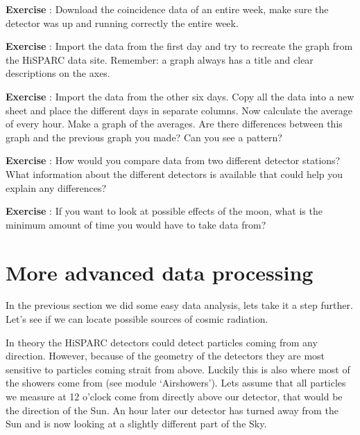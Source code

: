 \documentclass[12pt,a4paper]{article}
\numberwithin{equation}{section}
\numberwithin{figure}{section}
\newcounter{Exercise}
\numberwithin{table}{section}
\begin{document}
\begin{shaded}
\textbf{Exercise \theExercise {}} : Download the coincidence data of an entire week, make sure the detector was up and running correctly the entire week.\end{shaded}
\begin{shaded}
\textbf{Exercise \theExercise {}} : Import the data from the first day and try to recreate the graph from the HiSPARC data site. Remember: a graph always has a title and clear descriptions on the axes.\end{shaded}
\begin{shaded}
\textbf{Exercise \theExercise {}} : Import the data from the other six days. Copy all the data into a new sheet and place the different days in separate columns. Now calculate the average of every hour. Make a graph of the averages. Are there differences between this graph and the previous graph you made? Can you see a pattern?\end{shaded}
\begin{shaded}
\textbf{Exercise \theExercise {}} : How would you compare data from two different detector stations? What information about the different detectors is available that could help you explain any differences?\end{shaded}
\begin{shaded}
\textbf{Exercise \theExercise {}} : If you want to look at possible effects of the moon, what is the minimum amount of time you would have to take data from?\end{shaded}

\section{More advanced data processing}
In the previous section we did some easy data analysis, lets take it a step further. Let's see if we can locate possible sources of cosmic radiation.

In theory the HiSPARC detectors could detect particles coming from any direction. However, because of the geometry of the detectors they are most sensitive to particles coming strait from above. Luckily this is also where most of the showers come from (see module `Airshowers'). Lets assume that all particles we measure at 12 o'clock come from directly above our detector, that would be the direction of the Sun. An hour later our detector has turned away from the Sun and is now looking at a slightly different part of the Sky. 
\end{document}
